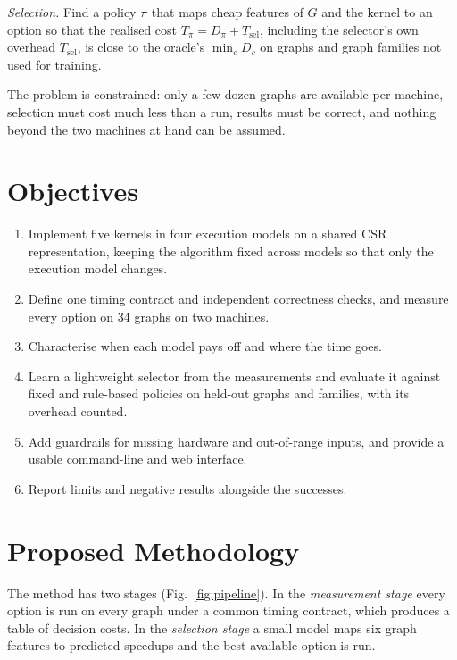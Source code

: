 \documentclass[conference]{IEEEtran}
\begin{document}
\emph{Selection.} Find a policy $\pi$ that maps cheap features of $G$ and the kernel to an option so that the realised cost $T_\pi = D_{\pi}+T_{\text{sel}}$, including the selector's own overhead $T_{\text{sel}}$, is close to the oracle's $\min_c D_c$ on graphs and graph families not used for training.

The problem is constrained: only a few dozen graphs are available per machine, selection must cost much less than a run, results must be correct, and nothing beyond the two machines at hand can be assumed.

\section{Objectives}
\begin{enumerate}
\item Implement five kernels in four execution models on a shared CSR representation, keeping the algorithm fixed across models so that only the execution model changes.
\item Define one timing contract and independent correctness checks, and measure every option on 34 graphs on two machines.
\item Characterise when each model pays off and where the time goes.
\item Learn a lightweight selector from the measurements and evaluate it against fixed and rule-based policies on held-out graphs and families, with its overhead counted.
\item Add guardrails for missing hardware and out-of-range inputs, and provide a usable command-line and web interface.
\item Report limits and negative results alongside the successes.
\end{enumerate}

\section{Proposed Methodology}
The method has two stages (Fig.~\ref{fig:pipeline}). In the \emph{measurement stage} every option is run on every graph under a common timing contract, which produces a table of decision costs. In the \emph{selection stage} a small model maps six graph features to predicted speedups and the best available option is run.
\end{document}
